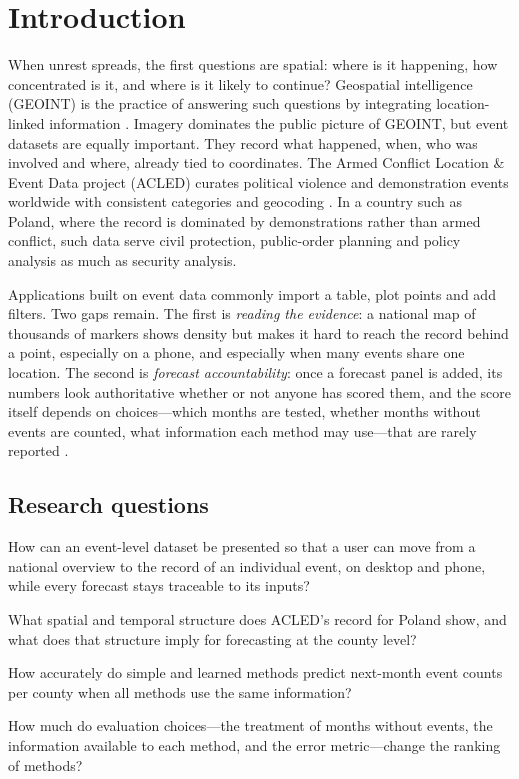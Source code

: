 \documentclass[11pt,a4paper]{article}
\begin{document}
\section{Introduction}
\label{sec:intro}

When unrest spreads, the first questions are spatial: where is it happening, how concentrated is it, and where is it likely to continue? Geospatial intelligence (GEOINT) is the practice of answering such questions by integrating location-linked information \cite{nga2018}. Imagery dominates the public picture of GEOINT, but event datasets are equally important. They record what happened, when, who was involved and where, already tied to coordinates. The Armed Conflict Location \& Event Data project (ACLED) curates political violence and demonstration events worldwide with consistent categories and geocoding \cite{raleigh2010,acled2024}. In a country such as Poland, where the record is dominated by demonstrations rather than armed conflict, such data serve civil protection, public-order planning and policy analysis as much as security analysis.

Applications built on event data commonly import a table, plot points and add filters. Two gaps remain. The first is \emph{reading the evidence}: a national map of thousands of markers shows density but makes it hard to reach the record behind a point, especially on a phone, and especially when many events share one location. The second is \emph{forecast accountability}: once a forecast panel is added, its numbers look authoritative whether or not anyone has scored them, and the score itself depends on choices---which months are tested, whether months without events are counted, what information each method may use---that are rarely reported \cite{tashman2000,kapoor2023}.

\subsection{Research questions}

\begin{description}[leftmargin=2.6em,style=nextline]
  \item[RQ1] How can an event-level dataset be presented so that a user can move from a national overview to the record of an individual event, on desktop and phone, while every forecast stays traceable to its inputs?
  \item[RQ2] What spatial and temporal structure does ACLED's record for Poland show, and what does that structure imply for forecasting at the county level?
  \item[RQ3] How accurately do simple and learned methods predict next-month event counts per county when all methods use the same information?
  \item[RQ4] How much do evaluation choices---the treatment of months without events, the information available to each method, and the error metric---change the ranking of methods?
\end{description}
\end{document}
